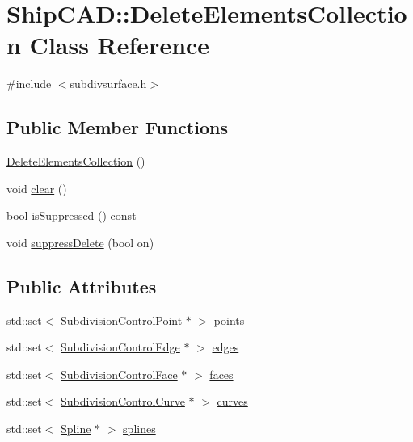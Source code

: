 \hypertarget{classShipCAD_1_1DeleteElementsCollection}{}\section{Ship\+C\+AD\+:\+:Delete\+Elements\+Collection Class Reference}
\label{classShipCAD_1_1DeleteElementsCollection}


{\ttfamily \#include $<$subdivsurface.\+h$>$}

\subsection*{Public Member Functions}
\begin{DoxyCompactItemize}
\item 
\hyperlink{classShipCAD_1_1DeleteElementsCollection_af90e27d3cab0018d689c1dfbbceeb8b9}{Delete\+Elements\+Collection} ()
\item 
void \hyperlink{classShipCAD_1_1DeleteElementsCollection_a42e99c010dff8fa9da3bccc6747b3b00}{clear} ()
\item 
bool \hyperlink{classShipCAD_1_1DeleteElementsCollection_a933c0b0679bf4b4d0017e7bb791001ef}{is\+Suppressed} () const 
\item 
void \hyperlink{classShipCAD_1_1DeleteElementsCollection_a6e6bd4397f891b9db53647ccc8444d0b}{suppress\+Delete} (bool on)
\end{DoxyCompactItemize}
\subsection*{Public Attributes}
\begin{DoxyCompactItemize}
\item 
std\+::set$<$ \hyperlink{classShipCAD_1_1SubdivisionControlPoint}{Subdivision\+Control\+Point} $\ast$ $>$ \hyperlink{classShipCAD_1_1DeleteElementsCollection_a7e5748f6463683b23a8b762ceadeb49a}{points}
\item 
std\+::set$<$ \hyperlink{classShipCAD_1_1SubdivisionControlEdge}{Subdivision\+Control\+Edge} $\ast$ $>$ \hyperlink{classShipCAD_1_1DeleteElementsCollection_a43038e1787626cde31dcb023366d886d}{edges}
\item 
std\+::set$<$ \hyperlink{classShipCAD_1_1SubdivisionControlFace}{Subdivision\+Control\+Face} $\ast$ $>$ \hyperlink{classShipCAD_1_1DeleteElementsCollection_ad032ba30c3ca251e710d0cb02abeb3d2}{faces}
\item 
std\+::set$<$ \hyperlink{classShipCAD_1_1SubdivisionControlCurve}{Subdivision\+Control\+Curve} $\ast$ $>$ \hyperlink{classShipCAD_1_1DeleteElementsCollection_a9d5c12e9ab17876c05a598419f79f5a4}{curves}
\item 
std\+::set$<$ \hyperlink{classShipCAD_1_1Spline}{Spline} $\ast$ $>$ \hyperlink{classShipCAD_1_1DeleteElementsCollection_a80150f5eea2654362d89f14105212c1c}{splines}
\end{DoxyCompactItemize}


